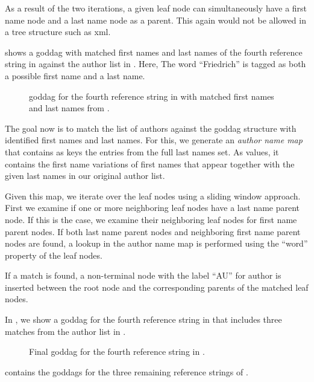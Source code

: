 As a result of the two iterations, a given leaf node can simultaneously have a first name node and a last name node as a parent.
This again would not be allowed in a tree structure such as \gls{xml}.

 shows a \gls{goddag} with matched first names and last names of the fourth reference string in  against the author list in .
Here, The word ``Friedrich'' is tagged as both a possible first name and a last name.
\begin{figure}[t]
  \centering
\resizebox{\linewidth}{!}{%
  
}
\caption{\gls{goddag} for the fourth reference string in  with matched first names and last names from .}
\label{fig:example-goddag-4-names}
\end{figure}

\bigskip

The goal now is to match the list of authors against the \gls{goddag} structure with identified first names and last names.
For this, we generate an \textit{author name map} that contains as keys the entries from the full last names set.
As values, it contains the first name variations of first names that appear together with the given last names in our original author list.

Given this map, we iterate over the leaf nodes using a sliding window approach.
First we examine if one or more neighboring leaf nodes have a last name parent node.
If this is the case, we examine their neighboring leaf nodes for first name parent nodes.
If both last name parent nodes and neighboring first name parent nodes are found, a lookup in the author name map is performed using the ``word'' property of the leaf nodes.

If a match is found, a non-terminal node with the label ``AU'' for author is inserted between the root node and the corresponding parents of the matched leaf nodes.

In , we show a \gls{goddag} for the fourth reference string in  that includes three matches from the author list in .
\begin{figure}[t]
  \centering
\resizebox{\linewidth}{!}{%
  
}
\caption{Final \gls{goddag} for the fourth reference string in .}
\label{fig:example-goddag-4-final}
\end{figure}
 contains the \glspl{goddag} for the three remaining reference strings of .

